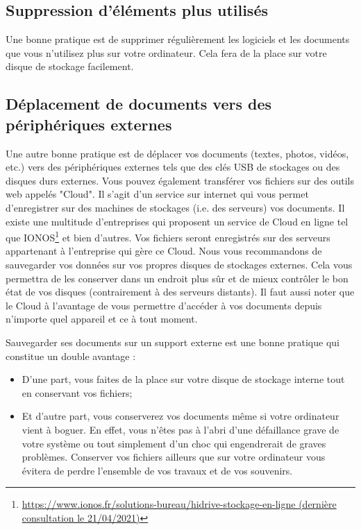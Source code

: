 \documentclass[12pt]{book}
\begin{document}
		\subsection{Suppression d'éléments plus utilisés}
			Une bonne pratique est de supprimer régulièrement les logiciels et les documents que vous n'utilisez plus sur votre ordinateur.
			Cela fera de la place sur votre disque de stockage facilement.
		\subsection{Déplacement de documents vers des périphériques externes}
			Une autre bonne pratique est de déplacer vos documents (textes, photos, vidéos, etc.) vers des périphériques externes tels que des clés USB de stockages ou des disques durs externes.
			Vous pouvez également transférer vos fichiers sur des outils web appelés "Cloud".
			Il s'agit d'un service sur internet qui vous permet d'enregistrer sur des machines de stockages (i.e. des serveurs) vos documents.
			Il existe une multitude d'entreprises qui proposent un service de Cloud en ligne tel que IONOS\footnote{\href{https://www.ionos.fr/solutions-bureau/hidrive-stockage-en-ligne}{https://www.ionos.fr/solutions-bureau/hidrive-stockage-en-ligne (dernière consultation le 21/04/2021)}} et bien d'autres.
			Vos fichiers seront enregistrés sur des serveurs appartenant à l'entreprise qui gère ce Cloud.
			Nous vous recommandons de sauvegarder vos données sur vos propres disques de stockages externes.
			Cela vous permettra de les conserver dans un endroit plus sûr et de mieux contrôler le bon état de vos disques (contrairement à des serveurs distants).
			Il faut aussi noter que le Cloud à l'avantage de vous permettre d'accéder à vos documents depuis n'importe quel appareil et ce à tout moment.\par
			Sauvegarder ses documents sur un support externe est une bonne pratique qui constitue un double avantage :
			\begin{itemize}
				\item D'une part, vous faites de la place sur votre disque de stockage interne tout en conservant vos fichiers;
				\item Et d'autre part, vous conserverez vos documents même si votre ordinateur vient à boguer.
				En effet, vous n'êtes pas à l'abri d'une défaillance grave de votre système ou tout simplement d'un choc qui engendrerait de graves problèmes.
				Conserver vos fichiers ailleurs que sur votre ordinateur vous évitera de perdre l'ensemble de vos travaux et de vos souvenirs.
			\end{itemize}
\end{document}
